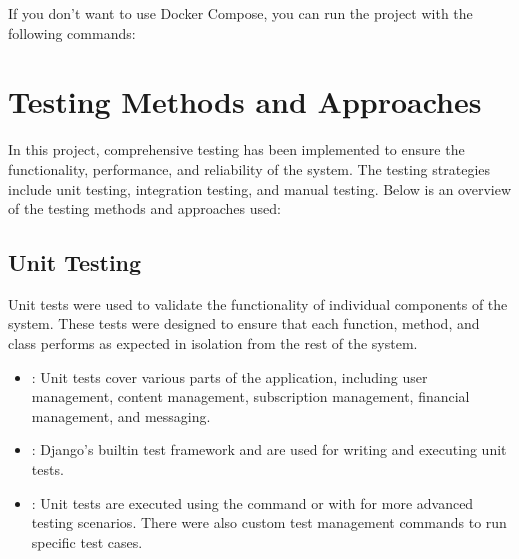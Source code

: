 \documentclass[letterpaper,10pt,english]{sphinxmanual}
\begin{document}
\sphinxAtStartPar
If you don’t want to use Docker Compose, you can run the project with the following commands:

\begin{sphinxVerbatim}[commandchars=\\\{\}]







\end{sphinxVerbatim}

\sphinxstepscope


\chapter{Testing Methods and Approaches}
\label{\detokenize{modules/testing:testing-methods-and-approaches}}\label{\detokenize{modules/testing::doc}}
\sphinxAtStartPar
In this project, comprehensive testing has been implemented to ensure the functionality, performance, and reliability of the system. The testing strategies include unit testing, integration testing, and manual testing. Below is an overview of the testing methods and approaches used:


\section{Unit Testing}
\label{\detokenize{modules/testing:unit-testing}}
\sphinxAtStartPar
Unit tests were used to validate the functionality of individual components of the system. These tests were designed to ensure that each function, method, and class performs as expected in isolation from the rest of the system.
\begin{itemize}
\item {} 
\sphinxAtStartPar
{}: Unit tests cover various parts of the application, including user management, content management, subscription management, financial management, and messaging.

\item {} 
\sphinxAtStartPar
{}: Django’s built\sphinxhyphen{}in test framework and  are used for writing and executing unit tests.

\item {} 
\sphinxAtStartPar
{}: Unit tests are executed using the command  or with  for more advanced testing scenarios. There were also custom test management commands to run specific test cases.

\end{itemize}
\end{document}
